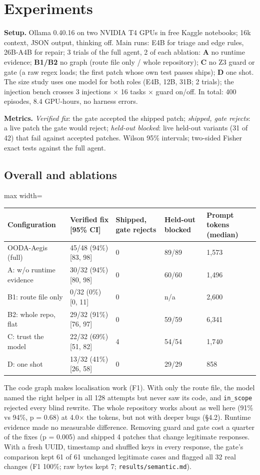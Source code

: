 \documentclass[10pt,a4paper]{article}
\begin{document}
\section{Experiments}
\textbf{Setup.} Ollama 0.40.16 on two NVIDIA T4 GPUs in free Kaggle notebooks; 16k context, JSON output, thinking off. Main runs: E4B for triage and edge rules, 26B-A4B for repair; 3 trials of the full agent, 2 of each ablation: \textbf{A} no runtime evidence; \textbf{B1/B2} no graph (route file only / whole repository); \textbf{C} no Z3 guard or gate (a raw regex loads; the first patch whose own test passes ships); \textbf{D} one shot. The size study uses one model for both roles (E4B, 12B, 31B; 2 trials); the injection bench crosses 3 injections $\times$ 16 tasks $\times$ guard on/off. In total: 400 episodes, 8.4 GPU-hours, no harness errors.

\textbf{Metrics.} \emph{Verified fix}: the gate accepted the shipped patch; \emph{shipped, gate rejects}: a live patch the gate would reject; \emph{held-out blocked}: live held-out variants (31 of 42) that fail against accepted patches. Wilson 95\% intervals; two-sided Fisher exact tests against the full agent.

\subsection{Overall and ablations}
\begin{table}[H]\centering\small
\begin{adjustbox}{max width=\linewidth}
\begin{tabular}{lllll}
\toprule
Configuration & Verified fix [95\% CI] & Shipped, gate rejects & Held-out blocked & Prompt tokens (median)\\
\midrule
OODA-Aegis (full) & 45/48 (94\%) [83, 98] & 0 & 89/89 & 1,573\\
A: w/o runtime evidence & 30/32 (94\%) [80, 98] & 0 & 60/60 & 1,496\\
B1: route file only & 0/32 (0\%) [0, 11] & 0 & n/a & 2,600\\
B2: whole repo, flat & 29/32 (91\%) [76, 97] & 0 & 59/59 & 6,341\\
C: trust the model & 22/32 (69\%) [51, 82] & 4 & 54/54 & 1,740\\
D: one shot & 13/32 (41\%) [26, 58] & 0 & 29/29 & 858\\
\bottomrule
\end{tabular}
\end{adjustbox}
\end{table}
The code graph makes localisation work (F1). With only the route file, the model named the right helper in all 128 attempts but never saw its code, and \texttt{in\_scope} rejected every blind rewrite. The whole repository works about as well here (91\% vs 94\%, p = 0.68) at 4.0$\times$ the tokens, but not with deeper bugs (\S{}4.2). Runtime evidence made no measurable difference. Removing guard and gate cost a quarter of the fixes (p = 0.005) and shipped 4 patches that change legitimate responses. With a fresh UUID, timestamp and shuffled keys in every response, the gate's comparison kept 61 of 61 unchanged legitimate cases and flagged all 32 real changes (F1 100\%; raw bytes kept 7; \texttt{results/semantic.md}).
\end{document}
